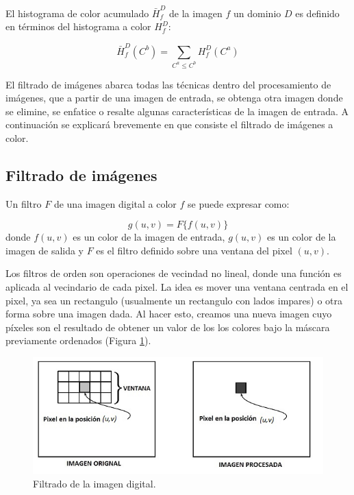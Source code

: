 	El histograma de color acumulado $\bar{H}^D_f$ de la imagen $f$ un dominio $D$ es definido en términos del histograma a color $H^D_{f}$: 
	
	\begin{equation}
	\bar{H}^D_f(C^b) = \sum_{C^a \leq C^b} H^D_f(C^a)
	\end{equation}


El filtrado de im\'agenes abarca todas las t\'ecnicas dentro del procesamiento de im\'agenes, que a partir de una imagen de entrada, se obtenga otra imagen donde se elimine, se enfatice o resalte algunas caracter\'isticas de la imagen de entrada. A continuaci\'on se explicar\'a brevemente en que consiste el filtrado de im\'agenes a color. 

\subsection{Filtrado  de im\'agenes}
Un filtro $F$ de una imagen digital a color $f$ se puede expresar como:

\begin{equation}
\label{Filtrado} 
      g(u,v) = F\{f(u,v)\}
\end{equation}
donde $f(u,v)$ es un color de la imagen de entrada, $g(u,v)$ es un color de la imagen de salida y $F$ es el filtro definido sobre una ventana del pixel $(u,v)$.


Los filtros de orden son operaciones de vecindad no lineal, donde una funci\'on es aplicada al vecindario de cada pixel. La idea es mover una ventana centrada en el pixel, ya sea un rectangulo (usualmente un rectangulo con lados impares) o otra forma sobre una imagen dada. Al hacer esto, creamos una nueva imagen cuyo p\'ixeles son el resultado de obtener un valor de los los colores bajo la m\'ascara previamente ordenados (Figura \ref{fig:Filt}). 


\begin{figure}[htbp]
	\centering
		\includegraphics[scale=0.5]{fig/Filt.jpg}
	\caption{Filtrado de la imagen digital.}
	\label{fig:Filt}
\end{figure}



